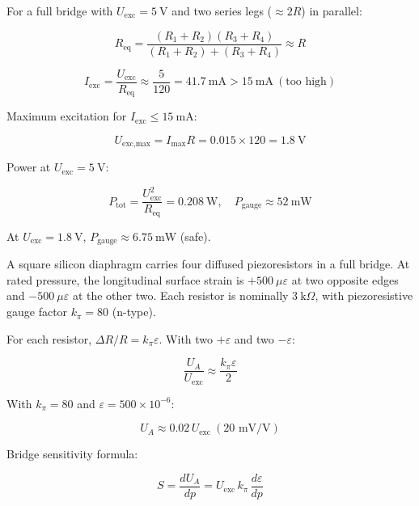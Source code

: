 \begin{solutionblock}
For a full bridge with \(U_\text{exc} = 5\ \text{V}\) and two series legs (\(\approx 2R\)) in parallel:

\[
R_\text{eq} = \frac{(R_1+R_2)(R_3+R_4)}{(R_1+R_2)+(R_3+R_4)} \approx R
\]

\[
I_\text{exc} = \frac{U_\text{exc}}{R_\text{eq}} \approx \frac{5}{120} = 41.7\ \text{mA} > 15\ \text{mA} \ (\text{too high})
\]

Maximum excitation for \(I_\text{exc} \le 15\ \text{mA}\):

\[
U_{\text{exc,max}} = I_\text{max} R = 0.015 \times 120 = 1.8\ \text{V}
\]

Power at \(U_\text{exc} = 5\ \text{V}\):

\[
P_\text{tot} = \frac{U_\text{exc}^2}{R_\text{eq}} = 0.208\ \text{W}, \quad P_\text{gauge} \approx 52\ \text{mW}
\]

At \(U_\text{exc} = 1.8\ \text{V}\), \(P_\text{gauge} \approx 6.75\ \text{mW}\) (safe).

\end{solutionblock}


A square silicon diaphragm carries four diffused piezoresistors in a full bridge. At rated pressure, the longitudinal surface strain is \(+500~\mu\varepsilon\) at two opposite edges and \(-500~\mu\varepsilon\) at the other two. Each resistor is nominally \(3~\text{k}\Omega\), with piezoresistive gauge factor \(k_\pi = 80\) (n-type).



\begin{solutionblock}
For each resistor, \(\Delta R / R = k_\pi \varepsilon\). With two \(+\varepsilon\) and two \(-\varepsilon\):

\[
\frac{U_A}{U_\text{exc}} \approx \frac{k_\pi \varepsilon}{2}
\]

With \(k_\pi = 80\) and \(\varepsilon = 500\times10^{-6}\):

\[
U_A \approx 0.02\, U_\text{exc} \ (\text{20 mV/V})
\]

Bridge sensitivity formula:

\[
S = \frac{dU_A}{dp} = U_\text{exc} \, k_\pi \, \frac{d\varepsilon}{dp}
\]
\end{solutionblock}


